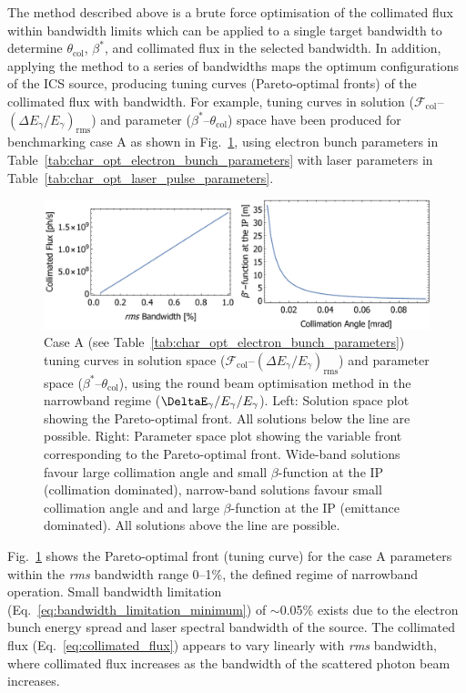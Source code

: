 \documentclass[../main.tex]{subfiles}
\begin{document}
The method described above is a brute force optimisation of the collimated flux within bandwidth limits which can be applied to a single target bandwidth to determine $\theta_{\mathrm{col}}$, $\beta^{*}$, and collimated flux in the selected bandwidth. In addition, applying the method to a series of bandwidths maps the optimum configurations of the ICS source, producing tuning curves (Pareto-optimal fronts) of the collimated flux with bandwidth. For example, tuning curves in solution ($\mathcal{F}_{\mathrm{col}}$--$\left(\Delta E_{\gamma}/E_{\gamma}\right)_{\mathrm{rms}}$) and parameter ($\beta^{*}$--$\theta_{\mathrm{col}}$) space have been produced for benchmarking case A as shown in Fig.~\ref{fig:CaseA_RB_tuning_curve}, using electron bunch parameters in Table~\ref{tab:char_opt_electron_bunch_parameters} with laser parameters in Table~\ref{tab:char_opt_laser_pulse_parameters}. 
\begin{figure}[!h]
\centering
\includegraphics[width=\textwidth]{Figures/Optimisation_and_Characterisation_of_Inverse_Compton_Scattering_Sources/Case_A_RB_Tuning_Curves.pdf}
\caption{Case A (see Table~\ref{tab:char_opt_electron_bunch_parameters}) tuning curves in solution space ($\mathcal{F}_{\mathrm{col}}$--$\left(\Delta E_{\gamma}/E_{\gamma}\right)_{\mathrm{rms}}$) and parameter space ($\beta^{*}$--$\theta_{\mathrm{col}}$), using the round beam optimisation method in the narrowband regime ($\DeltaE_{\gamma}/E_{\gamma}/E_{\gamma}$). Left: Solution space plot showing the Pareto-optimal front. All solutions below the line are possible. Right: Parameter space plot showing the variable front corresponding to the Pareto-optimal front. Wide-band solutions favour large collimation angle and small $\beta$-function at the IP (collimation dominated), narrow-band solutions favour small collimation angle and and large $\beta$-function at the IP (emittance dominated). All solutions above the line are possible.}
\label{fig:CaseA_RB_tuning_curve}
\end{figure}

Fig.~\ref{fig:CaseA_RB_tuning_curve} shows the Pareto-optimal front (tuning curve) for the case A parameters within the \textit{rms} bandwidth range 0--1\%, the defined regime of narrowband operation. Small bandwidth limitation (Eq.~\ref{eq:bandwidth_limitation_minimum}) of $\sim$0.05\% exists due to the electron bunch energy spread and laser spectral bandwidth of the source. The collimated flux (Eq.~\ref{eq:collimated_flux}) appears to vary linearly with \textit{rms} bandwidth, where collimated flux increases as the bandwidth of the scattered photon beam increases.  
\end{document}
